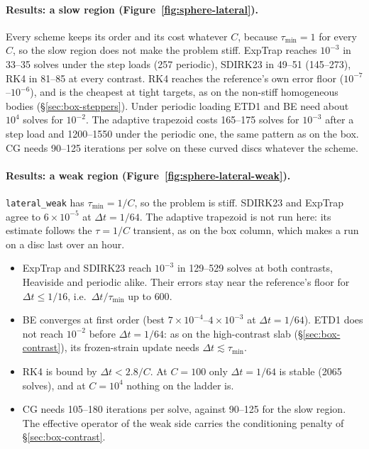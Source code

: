 \documentclass[11pt]{article}
\numberwithin{equation}{section}
\newcommand{\code}[1]{\texttt{#1}}
\begin{document}
\paragraph{Results: a slow region (Figure~\ref{fig:sphere-lateral}).}
Every scheme keeps its order and its cost whatever $C$, because
$\tau_{\min}=1$ for every $C$, so the slow region does not make the
problem stiff. ExpTrap reaches $10^{-3}$ in 33--35 solves under the step
loads (257 periodic), SDIRK23 in 49--51 (145--273), RK4 in 81--85 at every
contrast. RK4 reaches the reference's own error floor
($10^{-7}$--$10^{-6}$), and is the cheapest at tight targets, as on the
non-stiff homogeneous bodies (\S\ref{sec:box-steppers}). Under periodic
loading ETD1 and BE need about $10^4$ solves for $10^{-2}$. The
adaptive trapezoid costs 165--175 solves for $10^{-3}$ after a step load
and 1200--1550 under the periodic one, the same pattern as on the box.
CG needs 90--125 iterations per solve on these curved discs whatever the
scheme.

\paragraph{Results: a weak region (Figure~\ref{fig:sphere-lateral-weak}).}
\code{lateral\_weak} has $\tau_{\min}=1/C$, so the problem is stiff.
SDIRK23 and ExpTrap agree to $6\times10^{-5}$ at $\Delta t=1/64$. The
adaptive trapezoid is not run here: its estimate follows the $\tau=1/C$
transient, as on the box column, which makes a run on a disc last over an
hour.
\begin{itemize}[leftmargin=*]
\item ExpTrap and SDIRK23 reach $10^{-3}$ in 129--529 solves at both
  contrasts, Heaviside and periodic alike. Their errors stay near the
  reference's floor for $\Delta t\le1/16$, i.e.\ $\Delta t/\tau_{\min}$
  up to $600$.
\item BE converges at first order (best $7\times10^{-4}$--$4\times10^{-3}$
  at $\Delta t=1/64$). ETD1 does not reach $10^{-2}$ before
  $\Delta t=1/64$: as on the high-contrast slab
  (\S\ref{sec:box-contrast}), its frozen-strain update needs
  $\Delta t\lesssim\tau_{\min}$.
\item RK4 is bound by $\Delta t<2.8/C$. At $C=100$ only $\Delta t=1/64$ is
  stable (2065 solves), and at $C=10^4$ nothing on the ladder is.
\item CG needs 105--180 iterations per solve, against 90--125 for the
  slow region. The effective operator of the weak side carries the
  conditioning penalty of \S\ref{sec:box-contrast}.
\end{itemize}
\end{document}
